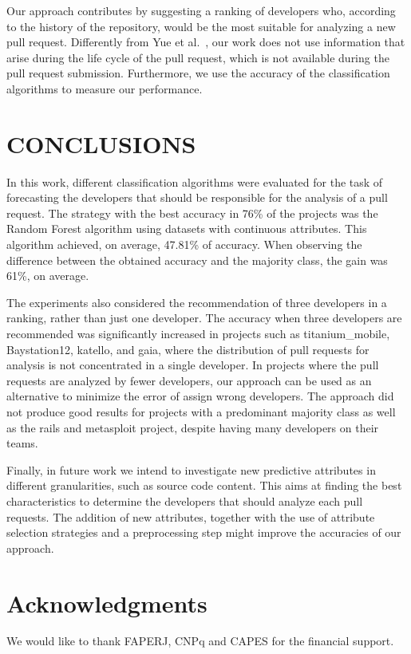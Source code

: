 \documentclass{sig-alternate}
\begin{document}
Our approach contributes by suggesting a ranking of developers who, according to the history of the repository, would be the most suitable for analyzing a new pull request. Differently from Yue et al.~\cite{yu_reviewer_2014}, our work does not use information that arise during the life cycle of the pull request, which is not available during the pull request submission. Furthermore, we use the accuracy of the classification algorithms to measure our performance.

\section{CONCLUSIONS}

In this work, different classification algorithms were evaluated for the task of forecasting the developers that should be responsible for the analysis of a pull request. The strategy with the best accuracy in 76\% of the projects was the Random Forest algorithm using datasets with continuous attributes. This algorithm achieved, on average, 47.81\% of accuracy. When observing the difference between the obtained accuracy and the majority class, the gain was 61\%, on average.

The experiments also considered the recommendation of three developers in a ranking, rather than just one developer. The accuracy when three developers are recommended was significantly increased in projects such as titanium\_mobile, Baystation12, katello, and gaia, where the distribution of pull requests for analysis is not concentrated in a single developer. In projects where the pull requests are analyzed by fewer developers, our approach can be used as an alternative to minimize the error of assign wrong developers. The approach did not produce good results for projects with a predominant majority class as well as the rails and metasploit project, despite having many developers on their teams. 

Finally, in future work we intend to investigate new predictive attributes in different granularities, such as source code content. This aims at finding the best characteristics to determine the developers that should analyze each pull requests. The addition of new attributes, together with the use of attribute selection strategies and a preprocessing step might improve the accuracies of our approach.

\section{Acknowledgments}
We would like to thank FAPERJ, CNPq and CAPES for the financial support.


\end{document}
